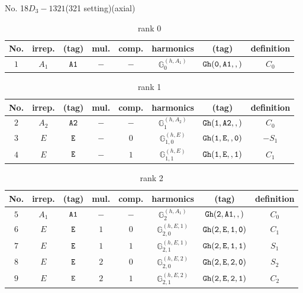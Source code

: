 \documentclass[fleqn,8pt]{jsarticle}
\begin{document}
\setcounter{MaxMatrixCols}{16}

\begin{center}
\LARGE
No. 18\quad$D_{3}-1$\quad$321$\quad(321 setting)\quad[ trigonal ] (axial)
\end{center}
\begin{table}[ht!]
\begin{center}
\caption{rank 0}
\renewcommand{\arraystretch}{1.3}
\begin{tabular}{cccccccc} \hline \hline
No. & irrep. & (tag) & mul. & comp. & harmonics & (tag) & definition \\ \hline
$ 1 $ & $ A_{1} $ & $ {\tt A1} $ & $ - $ & $ - $ & $ \mathbb{G}_{0}^{(h,A_{1})} $ & $ {\tt Gh(0,A1,,)} $ & $ C_{0} $ \\
 \hline \hline
\end{tabular}
\end{center}
\end{table}
\begin{table}[ht!]
\begin{center}
\caption{rank 1}
\renewcommand{\arraystretch}{1.3}
\begin{tabular}{cccccccc} \hline \hline
No. & irrep. & (tag) & mul. & comp. & harmonics & (tag) & definition \\ \hline
$ 2 $ & $ A_{2} $ & $ {\tt A2} $ & $ - $ & $ - $ & $ \mathbb{G}_{1}^{(h,A_{2})} $ & $ {\tt Gh(1,A2,,)} $ & $ C_{0} $ \\
$ 3 $ & $ E $ & $ {\tt E} $ & $ - $ & $ 0 $ & $ \mathbb{G}_{1,0}^{(h,E)} $ & $ {\tt Gh(1,E,,0)} $ & $ - S_{1} $ \\
$ 4 $ & $ E $ & $ {\tt E} $ & $ - $ & $ 1 $ & $ \mathbb{G}_{1,1}^{(h,E)} $ & $ {\tt Gh(1,E,,1)} $ & $ C_{1} $ \\
 \hline \hline
\end{tabular}
\end{center}
\end{table}
\begin{table}[ht!]
\begin{center}
\caption{rank 2}
\renewcommand{\arraystretch}{1.3}
\begin{tabular}{cccccccc} \hline \hline
No. & irrep. & (tag) & mul. & comp. & harmonics & (tag) & definition \\ \hline
$ 5 $ & $ A_{1} $ & $ {\tt A1} $ & $ - $ & $ - $ & $ \mathbb{G}_{2}^{(h,A_{1})} $ & $ {\tt Gh(2,A1,,)} $ & $ C_{0} $ \\
$ 6 $ & $ E $ & $ {\tt E} $ & $ 1 $ & $ 0 $ & $ \mathbb{G}_{2,0}^{(h,E,1)} $ & $ {\tt Gh(2,E,1,0)} $ & $ C_{1} $ \\
$ 7 $ & $ E $ & $ {\tt E} $ & $ 1 $ & $ 1 $ & $ \mathbb{G}_{2,1}^{(h,E,1)} $ & $ {\tt Gh(2,E,1,1)} $ & $ S_{1} $ \\
$ 8 $ & $ E $ & $ {\tt E} $ & $ 2 $ & $ 0 $ & $ \mathbb{G}_{2,0}^{(h,E,2)} $ & $ {\tt Gh(2,E,2,0)} $ & $ S_{2} $ \\
$ 9 $ & $ E $ & $ {\tt E} $ & $ 2 $ & $ 1 $ & $ \mathbb{G}_{2,1}^{(h,E,2)} $ & $ {\tt Gh(2,E,2,1)} $ & $ C_{2} $ \\
 \hline \hline
\end{tabular}
\end{center}
\end{table}
\end{document}
